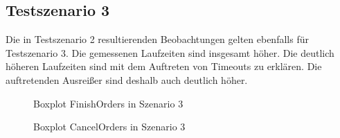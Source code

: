 \subsection{Testszenario 3}

Die in Testszenario 2 resultierenden Beobachtungen gelten ebenfalls für Testszenario 3. Die gemessenen Laufzeiten sind insgesamt höher. Die deutlich höheren Laufzeiten sind mit dem Auftreten von Timeouts zu erklären. Die auftretenden Ausreißer sind deshalb auch deutlich höher. 

\begin{figure}[!htbp]
	\begin{minipage}{.45\textwidth}
		
		\caption{Boxplot FinishOrders in Szenario 3}
		\label{fig:boxplot_finishorders_scenario3}
	\end{minipage}\hspace{\fill}%
	\begin{minipage}{.45\textwidth}
		
		\caption{Boxplot CancelOrders in Szenario 3}
		\label{fig:boxplot_cancelorders_scenario3}
	\end{minipage}
\end{figure}
\FloatBarrier